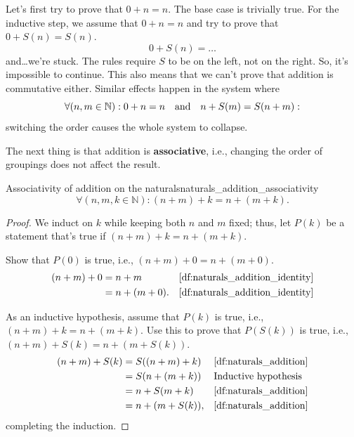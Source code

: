Let's first try to prove that \(0 + n = n\). The base case is trivially true. For the inductive
step, we assume that \(0 + n = n\) and try to prove that \(0 + S(n) = S(n)\).
\begin{equation}
  0 + S(n) = \dots
\end{equation}
and\dots we're stuck. The rules require \(S\) to be on the left, not on the right. So, it's
impossible to continue. This also means that we can't prove that addition is
commutative either. Similar effects happen in the system where
\begin{equation}
  \forall (n, m \in \mathbb{N}) : 0 + n = n \quad\textrm{and}\quad n + S(m) = S(n + m):
\end{equation}
switching the order causes the whole system to collapse.

The next thing is that addition is \textbf{associative}, i.e., changing the order of groupings does
not affect the result.
\begin{lemma}{Associativity of addition on the naturals}{naturals_addition_associativity}
  \begin{equation*}
    \forall (n, m, k \in \mathbb{N}) : (n + m) + k = n + (m + k).
  \end{equation*}
\end{lemma}
\begin{proof}
  We induct on \(k\) while keeping both \(n\) and \(m\) fixed; thus, let \(P(k)\) be a statement
  that's true if \((n + m) + k = n + (m + k)\).

  \basecase Show that \(P(0)\) is true, i.e., \((n + m) + 0 = n + (m + 0)\).
  \begin{align}
    (n + m) + 0 & = n + m        &  & \textrm{\Cref{df:naturals_addition_identity}} \\
                & = n + (m + 0). &  & \textrm{\Cref{df:naturals_addition_identity}}
  \end{align}

  \inductivestep As an inductive hypothesis, assume that \(P(k)\) is true, i.e.,
  \((n + m) + k = n + (m + k)\). Use this to prove that \(P(S(k))\) is true, i.e.,
  \((n + m) + S(k) = n + (m + S(k))\).
  \begin{align}
    (n + m) + S(k) & = S((n + m) + k)  &  & \textrm{\Cref{df:naturals_addition}} \\
                   & = S(n + (m + k))  &  & \textrm{Inductive hypothesis}        \\
                   & = n + S(m + k)    &  & \textrm{\Cref{df:naturals_addition}} \\
                   & = n + (m + S(k)), &  & \textrm{\Cref{df:naturals_addition}}
  \end{align}
  completing the induction.
\end{proof}

